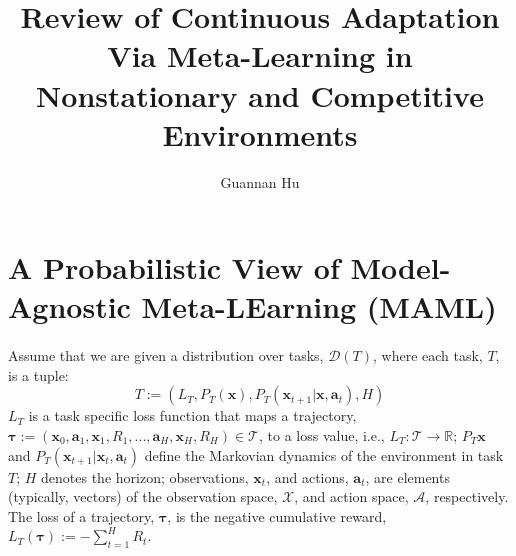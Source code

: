 \documentclass[12pt,a4paper]{article}
\begin{document}
\title{Review of Continuous Adaptation Via Meta-Learning in Nonstationary and Competitive Environments}
\author{Guannan Hu}
\maketitle
\section{A Probabilistic View of Model-Agnostic Meta-LEarning (MAML)}
\paragraph{}Assume that we are given a distribution over tasks, $\mathcal{D}(T)$, where each task, $T$, is a tuple:
\begin{equation}
\label{equat_1}
T := (L_T, P_T(\mathbf{x}), P_T(\mathbf{x}_{t+1}|\mathbf{x}, \mathbf{a}_t), H)
\end{equation}
$L_T$ is a task specific loss function that maps a trajectory, $\bm{\tau} := (\mathbf{x}_0, \mathbf{a}_1, \mathbf{x}_1, R_1, ..., \mathbf{a}_H, \mathbf{x}_H, R_H) \in \mathcal{T}$, to a loss value, i.e., $L_T: \mathcal{T} \rightarrow \mathbb{R}$; $P_T{\mathbf{x}}$ and $P_T(\mathbf{x}_{t+1}|\mathbf{x}_t, \mathbf{a}_t)$ define the Markovian dynamics of the environment in task $T$; $H$ denotes the horizon; observations, $\mathbf{x}_t$, and actions, $\mathbf{a}_t$, are elements (typically, vectors) of the observation space, $\mathcal{X}$, and action space, $\mathcal{A}$, respectively. The loss of a trajectory, $\bm{\tau}$, is the negative cumulative reward, $L_T(\bm{\tau}) := -\sum_{t=1}^{H}R_t$.
\end{document}
